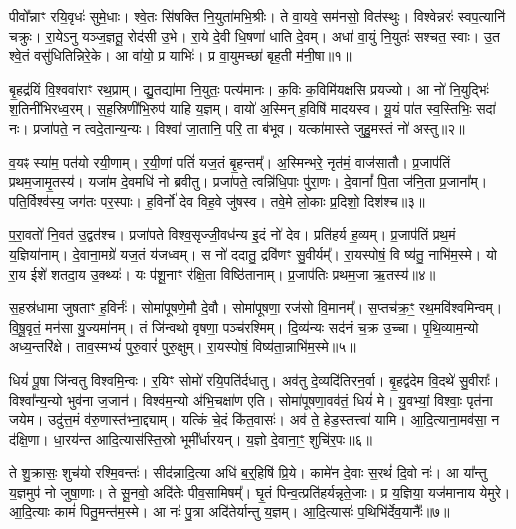 पीवो᳚न्नाꣳ रयि॒वृधः॑ सुमे॒धाः।
श्वे॒तः सि॑षक्ति नि॒युता॑\-मभि॒श्रीः।
ते वा॒यवे॒ सम॑नसो॒ वित॑स्थुः।
विश्वेन्नरः॑ स्वप॒त्यानि॑ चक्रुः।
रा॒येऽनु यञ्ज॒ज्ञतू॒ रोद॑सी उ॒भे।
रा॒ये दे॒वी धि॒षणा॑ धाति दे॒वम्।
अधा॑ वा॒युं नि॒युतः॑ सश्चत॒ स्वाः।
उ॒त श्वे॒तं वसु॑धितिन्निरे॒के।
आ वा॑यो॒ प्र याभिः॑।
प्र वा॒युमच्छा॑ बृह॒ती म॑नी॒षा॥१॥

बृ॒हद्र॑यिं वि॒श्ववा॑राꣳ रथ॒प्राम्।
द्यु॒तद्या॑मा नि॒युतः॒ पत्य॑मानः।
क॒विः क॒विमि॑यक्षसि प्रयज्यो।
आ नो॑ नि॒युद्भिः॑ श॒तिनी॑भिरध्व॒रम्।
स॒ह॒स्रिणी॑भि॒रुप॑ याहि य॒ज्ञम्।
वायो॑ अ॒स्मिन् ह॒विषि॑ मादयस्व।
यू॒यं पा॑त स्व॒स्तिभिः॒ सदा॑ नः।
प्रजा॑पते॒ न त्वदे॒तान्य॒न्यः।
विश्वा॑ जा॒तानि॒ परि॒ ता ब॑भूव।
यत्का॑मास्ते जुहु॒मस्तं नो॑ अस्तु॥२॥

व॒यꣴ स्या॑म॒ पत॑यो रयी॒णाम्।
र॒यी॒णां पतिं॑ यज॒तं बृ॒हन्तम्᳚।
अ॒स्मिन्भरे॒ नृत॑मं॒ वाज॑सातौ।
प्र॒जा\-प॑तिं प्रथम॒जामृ॒तस्य॑।
यजा॑म दे॒वमधि॑ नो ब्रवीतु।
प्रजा॑पते॒ त्वन्नि॑धि॒पाः पु॑रा॒णः।
दे॒वानां᳚ पि॒ता ज॑नि॒ता प्र॒जाना᳚म्।
पति॒र्विश्व॑स्य॒ जग॑तः पर॒स्पाः।
ह॒विर्नो॑ देव विह॒वे जु॑षस्व।
तवे॒मे लो॒काः प्र॒दिशो॒ दिश॑श्च॥३॥

प॒रा॒वतो॑ नि॒वत॑ उ॒द्वत॑श्च।
प्रजा॑पते विश्व॒सृज्जी॒वध॑न्य इ॒दं नो॑ देव।
प्रति॑\-हर्य ह॒व्यम्।
प्र॒जा\-प॑तिं प्रथ॒मं य॒ज्ञिया॑नाम्।
दे॒वाना॒मग्रे॑ यज॒तं य॑जध्वम्।
स नो॑ ददातु॒ द्रवि॑णꣳ सु॒वीर्यम्᳚।
रा॒यस्पोषं॒ वि ष्य॑तु॒ नाभि॑म॒स्मे।
यो रा॒य ईशे॑ शतदा॒य उ॒क्थ्यः॑।
यः प॑शू॒नाꣳ र॑क्षि॒ता विष्ठि॑तानाम्।
प्र॒जा\-प॑तिः प्रथम॒जा ऋ॒तस्य॑॥४॥

स॒हस्र॑धामा जुषताꣳ ह॒विर्नः॑।
सोमा॑पूषणे॒मौ दे॒वौ।
सोमा॑पूषणा॒ रज॑सो वि॒मानम्᳚।
स॒प्तच॑क्र॒ꣳ॒ रथ॒मवि॑श्वमिन्वम्।
वि॒षू॒वृतं॒ मन॑सा यु॒ज्यमा॑नम्।
तं जि॑न्वथो वृषणा॒ पञ्च॑रश्मिम्।
दि॒व्य॑न्यः सद॑नं च॒क्र उ॒च्चा।
पृ॒थि॒व्याम॒न्यो अध्य॒न्तरि॑क्षे।
ताव॒स्मभ्यं॑ पुरु॒वारं॑ पुरु॒क्षुम्।
रा॒यस्पोषं॒ विष्य॑ता॒न्नाभि॑म॒स्मे॥५॥

धियं॑ पू॒षा जि॑न्वतु विश्वमि॒न्वः।
र॒यिꣳ सोमो॑ रयि॒पति॑र्दधातु।
अव॑तु दे॒व्यदि॑तिरन॒र्वा।
बृ॒हद्व॑देम वि॒दथे॑ सु॒वीराः᳚।
विश्वा᳚न्य॒न्यो भुव॑ना ज॒जान॑।
विश्व॑म॒न्यो अ॑भि॒चक्षा॑ण एति।
सोमा॑पूषणा॒वव॑तं॒ धियं॑ मे।
यु॒वभ्यां॒ विश्वाः॒ पृत॑ना जयेम।
उदु॑त्त॒मं व॑रु॒णास्त॑भ्ना॒द्द्याम्।
यत्किं चे॒दं कि॑त॒वासः॑।
अव॑ ते॒ हेड॒स्तत्त्वा॑ यामि।
आ॒दि॒त्याना॒मव॑सा॒ न द॑क्षि॒णा।
धा॒रय॑न्त आदि॒त्यास॑स्ति॒स्रो भूमी᳚र्धारयन्।
य॒ज्ञो दे॒वाना॒ꣳ॒ शुचि॑र॒पः॥६॥\anuvakamend[म॒नी॒षा\-ऽस्तु॑ च॒र्तस्या॒स्मे कि॑त॒वास॑श्च॒त्वारि॑ च]

ते शु॒क्रासः॒ शुच॑यो रश्मि॒वन्तः॑।
सीद॑न्नादि॒त्या अधि॑ ब॒र्॒हिषि॑ प्रि॒ये।
कामे॑न दे॒वाः स॒रथं॑ दि॒वो नः॑।
आ या᳚न्तु य॒ज्ञमुप॑ नो जुषा॒णाः।
ते सू॒नवो॒ अदि॑तेः पीव॒सामिषम्᳚।
घृ॒तं पिन्व॒त्प्रति॑\-हर्यन्नृते॒जाः।
प्र य॒ज्ञिया॒ यज॑मानाय येमुरे।
आ॒दि॒त्याः कामं॑ पितु॒मन्त॑म॒स्मे।
आ नः॑ पु॒त्रा अदि॑तेर्यान्तु य॒ज्ञम्।
आ॒दि॒त्यासः॑ प॒थिभि॑र्देव॒यानैः᳚॥७॥

